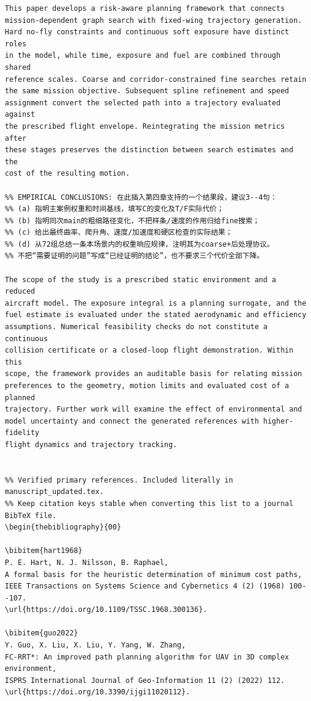 \documentclass[12pt]{article}
\begin{document}
\begin{verbatim}
This paper develops a risk-aware planning framework that connects
mission-dependent graph search with fixed-wing trajectory generation.
Hard no-fly constraints and continuous soft exposure have distinct roles
in the model, while time, exposure and fuel are combined through shared
reference scales. Coarse and corridor-constrained fine searches retain
the same mission objective. Subsequent spline refinement and speed
assignment convert the selected path into a trajectory evaluated against
the prescribed flight envelope. Reintegrating the mission metrics after
these stages preserves the distinction between search estimates and the
cost of the resulting motion.

%% EMPIRICAL CONCLUSIONS: 在此插入第四章支持的一个结果段，建议3--4句：
%% (a) 指明主案例权重和时间基线，填写C的变化及T/F实际代价；
%% (b) 指明同次main的粗细路径变化，不把样条/速度的作用归给fine搜索；
%% (c) 给出最终曲率、爬升角、速度/加速度和硬区检查的实际结果；
%% (d) 从72组总结一条本场景内的权重响应规律，注明其为coarse+后处理协议。
%% 不把“需要证明的问题”写成“已经证明的结论”，也不要求三个代价全部下降。

The scope of the study is a prescribed static environment and a reduced
aircraft model. The exposure integral is a planning surrogate, and the
fuel estimate is evaluated under the stated aerodynamic and efficiency
assumptions. Numerical feasibility checks do not constitute a continuous
collision certificate or a closed-loop flight demonstration. Within this
scope, the framework provides an auditable basis for relating mission
preferences to the geometry, motion limits and evaluated cost of a planned
trajectory. Further work will examine the effect of environmental and
model uncertainty and connect the generated references with higher-fidelity
flight dynamics and trajectory tracking.


%% Verified primary references. Included literally in manuscript_updated.tex.
%% Keep citation keys stable when converting this list to a journal BibTeX file.
\begin{thebibliography}{00}

\bibitem{hart1968}
P. E. Hart, N. J. Nilsson, B. Raphael,
A formal basis for the heuristic determination of minimum cost paths,
IEEE Transactions on Systems Science and Cybernetics 4 (2) (1968) 100--107.
\url{https://doi.org/10.1109/TSSC.1968.300136}.

\bibitem{guo2022}
Y. Guo, X. Liu, X. Liu, Y. Yang, W. Zhang,
FC-RRT*: An improved path planning algorithm for UAV in 3D complex environment,
ISPRS International Journal of Geo-Information 11 (2) (2022) 112.
\url{https://doi.org/10.3390/ijgi11020112}.


\end{verbatim}
\end{document}
